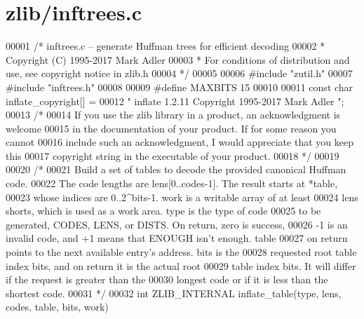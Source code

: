 \hypertarget{zlib_2inftrees_8c_source}{}\section{zlib/inftrees.c}
\label{zlib_2inftrees_8c_source}

\begin{DoxyCode}
00001 \textcolor{comment}{/* inftrees.c -- generate Huffman trees for efficient decoding}
00002 \textcolor{comment}{ * Copyright (C) 1995-2017 Mark Adler}
00003 \textcolor{comment}{ * For conditions of distribution and use, see copyright notice in zlib.h}
00004 \textcolor{comment}{ */}
00005 
00006 \textcolor{preprocessor}{#include "zutil.h"}
00007 \textcolor{preprocessor}{#include "inftrees.h"}
00008 
00009 \textcolor{preprocessor}{#define MAXBITS 15}
00010 
00011 \textcolor{keyword}{const} \textcolor{keywordtype}{char} inflate\_copyright[] =
00012    \textcolor{stringliteral}{" inflate 1.2.11 Copyright 1995-2017 Mark Adler "};
00013 \textcolor{comment}{/*}
00014 \textcolor{comment}{  If you use the zlib library in a product, an acknowledgment is welcome}
00015 \textcolor{comment}{  in the documentation of your product. If for some reason you cannot}
00016 \textcolor{comment}{  include such an acknowledgment, I would appreciate that you keep this}
00017 \textcolor{comment}{  copyright string in the executable of your product.}
00018 \textcolor{comment}{ */}
00019 
00020 \textcolor{comment}{/*}
00021 \textcolor{comment}{   Build a set of tables to decode the provided canonical Huffman code.}
00022 \textcolor{comment}{   The code lengths are lens[0..codes-1].  The result starts at *table,}
00023 \textcolor{comment}{   whose indices are 0..2^bits-1.  work is a writable array of at least}
00024 \textcolor{comment}{   lens shorts, which is used as a work area.  type is the type of code}
00025 \textcolor{comment}{   to be generated, CODES, LENS, or DISTS.  On return, zero is success,}
00026 \textcolor{comment}{   -1 is an invalid code, and +1 means that ENOUGH isn't enough.  table}
00027 \textcolor{comment}{   on return points to the next available entry's address.  bits is the}
00028 \textcolor{comment}{   requested root table index bits, and on return it is the actual root}
00029 \textcolor{comment}{   table index bits.  It will differ if the request is greater than the}
00030 \textcolor{comment}{   longest code or if it is less than the shortest code.}
00031 \textcolor{comment}{ */}
00032 \textcolor{keywordtype}{int} ZLIB\_INTERNAL inflate\_table(type, lens, codes, table, bits, work)

\end{DoxyCode}
